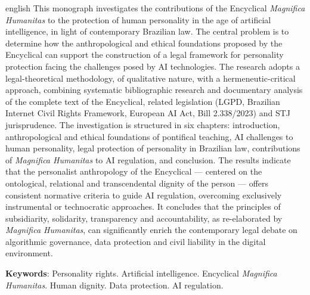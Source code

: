 \documentclass[
    12pt,
    openany,
    oneside,
    a4paper,
    brazilian
]{abntex2}
\newcommand{\MH}{\textit{Magnifica Humanitas}}
\begin{document}
\begin{resumo}[Abstract]
    \begin{otherlanguage*}{english}
        This monograph investigates the contributions of the Encyclical \MH{} to the protection of human personality in the age of artificial intelligence, in light of contemporary Brazilian law. The central problem is to determine how the anthropological and ethical foundations proposed by the Encyclical can support the construction of a legal framework for personality protection facing the challenges posed by AI technologies. The research adopts a legal-theoretical methodology, of qualitative nature, with a hermeneutic-critical approach, combining systematic bibliographic research and documentary analysis of the complete text of the Encyclical, related legislation (LGPD, Brazilian Internet Civil Rights Framework, European AI Act, Bill 2.338/2023) and STJ jurisprudence. The investigation is structured in six chapters: introduction, anthropological and ethical foundations of pontifical teaching, AI challenges to human personality, legal protection of personality in Brazilian law, contributions of \MH{} to AI regulation, and conclusion. The results indicate that the personalist anthropology of the Encyclical --- centered on the ontological, relational and transcendental dignity of the person --- offers consistent normative criteria to guide AI regulation, overcoming exclusively instrumental or technocratic approaches. It concludes that the principles of subsidiarity, solidarity, transparency and accountability, as re-elaborated by \MH{}, can significantly enrich the contemporary legal debate on algorithmic governance, data protection and civil liability in the digital environment.

        \vspace{0.3cm}
        \noindent
        \textbf{Keywords}: Personality rights. Artificial intelligence. Encyclical \MH. Human dignity. Data protection. AI regulation.
    \end{otherlanguage*}
\end{resumo}

\listoffigures
\clearpage

\listoftables
\clearpage
\end{document}
